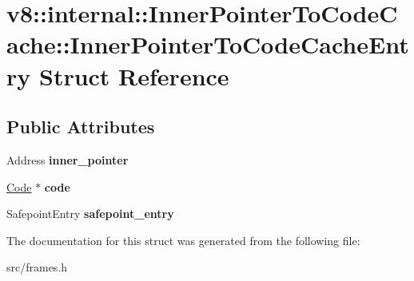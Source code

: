 \hypertarget{structv8_1_1internal_1_1_inner_pointer_to_code_cache_1_1_inner_pointer_to_code_cache_entry}{}\section{v8\+:\+:internal\+:\+:Inner\+Pointer\+To\+Code\+Cache\+:\+:Inner\+Pointer\+To\+Code\+Cache\+Entry Struct Reference}
\label{structv8_1_1internal_1_1_inner_pointer_to_code_cache_1_1_inner_pointer_to_code_cache_entry}
\subsection*{Public Attributes}
\begin{DoxyCompactItemize}
\item 
\hypertarget{structv8_1_1internal_1_1_inner_pointer_to_code_cache_1_1_inner_pointer_to_code_cache_entry_aa31c0b698b8935a0a890cd550f3b61c1}{}Address {\bfseries inner\+\_\+pointer}\label{structv8_1_1internal_1_1_inner_pointer_to_code_cache_1_1_inner_pointer_to_code_cache_entry_aa31c0b698b8935a0a890cd550f3b61c1}

\item 
\hypertarget{structv8_1_1internal_1_1_inner_pointer_to_code_cache_1_1_inner_pointer_to_code_cache_entry_acaa0672bd9e3a8f5572ea7247ff890ac}{}\hyperlink{classv8_1_1internal_1_1_code}{Code} $\ast$ {\bfseries code}\label{structv8_1_1internal_1_1_inner_pointer_to_code_cache_1_1_inner_pointer_to_code_cache_entry_acaa0672bd9e3a8f5572ea7247ff890ac}

\item 
\hypertarget{structv8_1_1internal_1_1_inner_pointer_to_code_cache_1_1_inner_pointer_to_code_cache_entry_a16d432760b60d92721b309f0d01b8837}{}Safepoint\+Entry {\bfseries safepoint\+\_\+entry}\label{structv8_1_1internal_1_1_inner_pointer_to_code_cache_1_1_inner_pointer_to_code_cache_entry_a16d432760b60d92721b309f0d01b8837}

\end{DoxyCompactItemize}


The documentation for this struct was generated from the following file\+:\begin{DoxyCompactItemize}
\item 
src/frames.\+h\end{DoxyCompactItemize}
